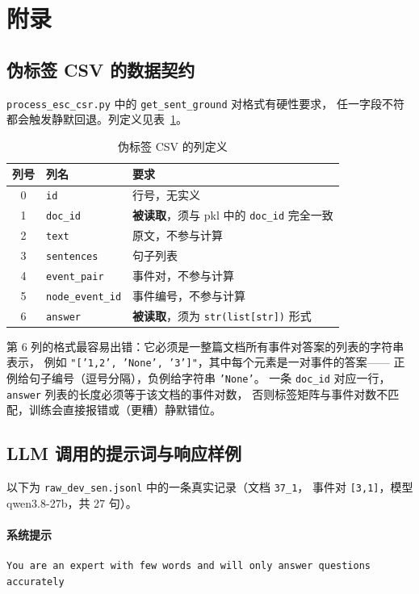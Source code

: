 \section{附录}

\subsection{伪标签 CSV 的数据契约}

\texttt{process\_esc\_csr.py} 中的 \texttt{get\_sent\_ground} 对格式有硬性要求，
任一字段不符都会触发静默回退。列定义见表~\ref{tab:csv}。

\begin{table}[H]
\centering
\caption{伪标签 CSV 的列定义}
\label{tab:csv}
\small
\begin{tabular}{cll}
\toprule
列号 & 列名 & 要求\\
\midrule
0 & \texttt{id} & 行号，无实义\\
1 & \texttt{doc\_id} & \textbf{被读取}，须与 pkl 中的 \texttt{doc\_id} 完全一致\\
2 & \texttt{text} & 原文，不参与计算\\
3 & \texttt{sentences} & 句子列表\\
4 & \texttt{event\_pair} & 事件对，不参与计算\\
5 & \texttt{node\_event\_id} & 事件编号，不参与计算\\
6 & \texttt{answer} & \textbf{被读取}，须为 \texttt{str(list[str])} 形式\\
\bottomrule
\end{tabular}
\end{table}

第 6 列的格式最容易出错：它必须是一整篇文档所有事件对答案的列表的字符串表示，
例如 \texttt{"['1,2', 'None', '3']"}，其中每个元素是一对事件的答案——
正例给句子编号（逗号分隔），负例给字符串 \texttt{'None'}。
一条 \texttt{doc\_id} 对应一行，\texttt{answer} 列表的长度必须等于该文档的事件对数，
否则标签矩阵与事件对数不匹配，训练会直接报错或（更糟）静默错位。

\subsection{LLM 调用的提示词与响应样例}

以下为 \texttt{raw\_dev\_sen.jsonl} 中的一条真实记录（文档 \texttt{37\_1}，
事件对 \texttt{[3,1]}，模型 qwen3.8-27b，共 27 句）。

\paragraph{系统提示}
\begin{lstlisting}
You are an expert with few words and will only answer questions accurately
\end{lstlisting}

